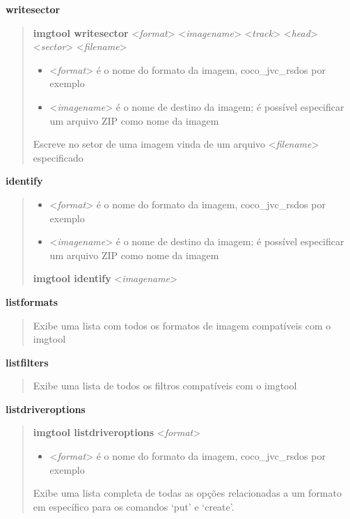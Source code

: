 \documentclass[letterpaper,10pt,brazil]{sphinxmanual}
\begin{document}
\textbf{writesector}
\begin{quote}

\textbf{imgtool writesector} \textless{}\emph{format}\textgreater{} \textless{}\emph{imagename}\textgreater{} \textless{}\emph{track}\textgreater{} \textless{}\emph{head}\textgreater{} \textless{}\emph{sector}\textgreater{} \textless{}\emph{filename}\textgreater{}
\begin{itemize}
\item {} 
\textless{}\emph{format}\textgreater{} é o nome do formato da imagem, coco\_jvc\_rsdos por exemplo

\item {} 
\textless{}\emph{imagename}\textgreater{} é o nome de destino da imagem; é possível especificar um arquivo ZIP como nome da imagem

\end{itemize}

Escreve no setor de uma imagem vinda de um arquivo \textless{}\emph{filename}\textgreater{} especificado
\end{quote}

\textbf{identify}
\begin{quote}
\begin{itemize}
\item {} 
\textless{}\emph{format}\textgreater{} é o nome do formato da imagem, coco\_jvc\_rsdos por exemplo

\item {} 
\textless{}\emph{imagename}\textgreater{} é o nome de destino da imagem; é possível especificar um arquivo ZIP como nome da imagem

\end{itemize}

\textbf{imgtool identify} \textless{}\emph{imagename}\textgreater{}
\end{quote}

\textbf{listformats}
\begin{quote}

Exibe uma lista com todos os formatos de imagem compatíveis com o imgtool
\end{quote}

\textbf{listfilters}
\begin{quote}

Exibe uma lista de todos os filtros compatíveis com o imgtool
\end{quote}

\textbf{listdriveroptions}
\begin{quote}

\textbf{imgtool listdriveroptions} \textless{}\emph{format}\textgreater{}
\begin{itemize}
\item {} 
\textless{}\emph{format}\textgreater{} é o nome do formato da imagem, coco\_jvc\_rsdos por exemplo

\end{itemize}

Exibe uma lista completa de todas as opções relacionadas a um formato em específico para os comandos `put' e `create'.
\end{quote}
\end{document}

